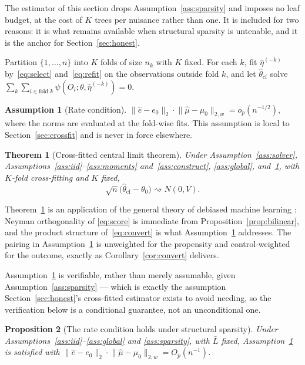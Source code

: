 \documentclass[11pt]{article}
\theoremstyle{plain}
\newtheorem{theorem}{Theorem}[section]
\newtheorem{proposition}[theorem]{Proposition}
\theoremstyle{definition}
\newtheorem{assumption}{Assumption}
\theoremstyle{remark}
\newcommand{\ez}{e_0}
\newcommand{\mz}{\mu_0}
\newcommand{\ehat}{\widehat{e}}
\newcommand{\mhat}{\widehat{\mu}}
\newcommand{\thetahat}{\widehat{\theta}}
\newcommand{\Ltwo}[1]{\lVert #1 \rVert_{2}}
\newcommand{\Lw}[1]{\lVert #1 \rVert_{2,w}}
\begin{document}
The estimator of this section drops Assumption~\ref{ass:sparsity} and imposes no
leaf budget, at the cost of $K$ trees per nuisance rather than one. It is
included for two reasons: it is what remains available when structural sparsity
is untenable, and it is the anchor for Section~\ref{sec:honest}.

Partition $\{1,\dots,n\}$ into $K$ folds of size $n_k$ with $K$ fixed. For each
$k$, fit $\widehat\eta^{(-k)}$ by~\eqref{eq:select} and~\eqref{eq:refit} on the
observations outside fold $k$, and let $\thetahat_{\mathrm{cf}}$ solve
$\sum_k\sum_{i\in\text{fold }k}\psi(O_i;\theta,\widehat\eta^{(-k)})=0$.

\begin{assumption}[Rate condition]\label{ass:rate}
$\Ltwo{\ehat-\ez}\cdot\Lw{\mhat-\mz}=o_p(n^{-1/2})$, where the norms are
evaluated at the fold-wise fits. This assumption is local to
Section~\ref{sec:crossfit} and is never in force elsewhere.
\end{assumption}

\begin{theorem}[Cross-fitted central limit theorem]\label{thm:crossfit}
Under Assumption~\ref{ass:solver}, Assumptions~\ref{ass:iid}--\ref{ass:moments}
and~\ref{ass:construct}, \ref{ass:global}, and~\ref{ass:rate}, with $K$-fold
cross-fitting and $K$ fixed,
\[
  \sqrt n\bigl(\thetahat_{\mathrm{cf}}-\theta_0\bigr)\rightsquigarrow N(0,V).
\]
\end{theorem}

\noindent Theorem~\ref{thm:crossfit} is an application of the general theory of
debiased machine learning \citep{chernozhukov2018}: Neyman orthogonality of
\eqref{eq:score} is immediate from Proposition~\ref{prop:bilinear}, and the
product structure of~\eqref{eq:convert} is what Assumption~\ref{ass:rate}
addresses. The pairing in Assumption~\ref{ass:rate} is unweighted for the
propensity and control-weighted for the outcome, exactly as
Corollary~\ref{cor:convert} delivers.

Assumption~\ref{ass:rate} is verifiable, rather than merely assumable, given
Assumption~\ref{ass:sparsity} --- which is exactly the assumption
Section~\ref{sec:honest}'s cross-fitted estimator exists to avoid needing, so
the verification below is a conditional guarantee, not an unconditional one.

\begin{proposition}[The rate condition holds under structural sparsity]
\label{prop:rate-verify}
Under Assumptions~\ref{ass:iid}--\ref{ass:global} and \ref{ass:sparsity},
with $\bar L$ fixed,
Assumption~\ref{ass:rate} is satisfied with
$\Ltwo{\ehat-\ez}\cdot\Lw{\mhat-\mz}=O_p(n^{-1})$.
\end{proposition}
\end{document}
